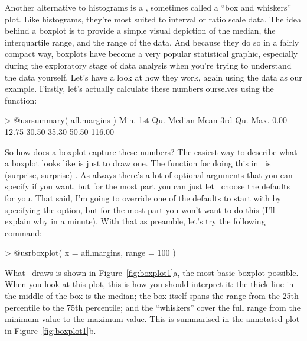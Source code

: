 Another alternative to histograms is a , sometimes called a ``box and whiskers'' plot. Like histograms, they're most suited to interval or ratio scale data. The idea behind a boxplot is to provide a simple visual depiction of the median, the interquartile range, and the range of the data. And because they do so in a fairly compact way, boxplots have become a very popular statistical graphic, especially during the exploratory stage of data analysis when you're trying to understand the data yourself. Let's have a look at how they work, again using the  data as our example. Firstly, let's actually calculate these numbers ourselves using the  function:
\begin{rblock1}
> @usr{summary( afl.margins )}
   Min. 1st Qu.  Median    Mean 3rd Qu.    Max. 
   0.00   12.75   30.50   35.30   50.50  116.00 
\end{rblock1}

So how does a boxplot capture these numbers? The easiest way to describe what a boxplot looks like is just to draw one. The function for doing this in \R\ is (surprise, surprise) . As always there's a lot of optional arguments that you can specify if you want, but for the most part you can just let \R\ choose the defaults for you. That said, I'm going to override one of the defaults to start with by specifying the  option, but for the most part you won't want to do this (I'll explain why in a minute). With that as preamble, let's try the following command:
\begin{rblock1}
> @usr{boxplot( x = afl.margins, range = 100 )}
\end{rblock1}
What \R\ draws is shown in Figure~\ref{fig:boxplot1}a, the most basic boxplot possible. When you look at this plot, this is how you should interpret it: the thick line in the middle of the box is the median; the box itself spans the range from the 25th percentile to the 75th percentile; and the ``whiskers'' cover the full range from the minimum value to the maximum value. This is summarised in the annotated plot in Figure~\ref{fig:boxplot1}b.

